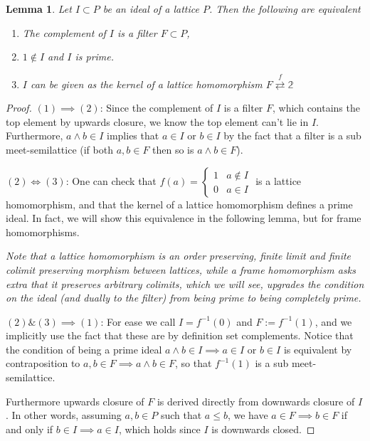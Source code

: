 \documentclass[12pt,a4paper]{article}
\newtheorem{lemma}{Lemma}[section] %
\begin{document}
\begin{lemma}
	Let $I \subset P$ be an ideal of a lattice $P$. Then the following are equivalent 
	\begin{enumerate}
		\item The complement of $I$ is a filter $F \subset P$,
		\item $1 \notin I$ and $I$ is prime.
		\item $I$ can be given as the kernel of a lattice homomorphism $F \stackrel{f}{\rightleftarrows} \mathbb{2}$
	\end{enumerate}
\end{lemma}
\begin{proof}
	$(1) \implies (2)$: Since the complement of $I$ is a filter $F$, which contains the top element by upwards closure, we know the top element can't lie in $I$. Furthermore, $a \land b \in I$ implies that $a \in I$ or $b \in I$ by the fact that a filter is a sub meet-semilattice (if both $a, b \in F$ then so is $a \land b \in F$).
	
	$(2) \iff (3)$: One can check that  $f(a) =  \begin{cases}
   1 & a \notin I \\
    0 & a \in I
  \end{cases}$ is a lattice homomorphism, and that the kernel of a lattice homomorphism defines a prime ideal. In fact, we will show this equivalence in the following lemma, but for frame homomorphisms. 
  
  \emph{Note that a lattice homomorphism is an order preserving, finite limit and finite colimit preserving morphism between lattices, while a frame homomorphism asks extra that it preserves arbitrary colimits, which we will see, upgrades the condition on the ideal (and dually to the filter) from being prime to being completely prime.}
  
  $(2) \& (3) \implies (1)$:  For ease we call $I = f^{-1}(0)$ and $F:= f^{-1}(1)$, and we implicitly use the fact that these are by definition set complements. Notice that the condition of being a prime ideal $a \land b \in I \implies a \in I$ or $b \in I$ is equivalent by contraposition to $a, b \in F \implies a \land b \in F$, so that $f^{-1}(1)$ is a sub meet-semilattice.
  
  Furthermore upwards closure of $F$ is derived directly from downwards closure of $I$. In other words, assuming $a, b \in P$ such that $a \leq b$, we have $a \in F \implies b \in F$ if and only if $ b \in I\implies a \in I$, which holds since $I$ is downwards closed.
\end{proof}
\end{document}
